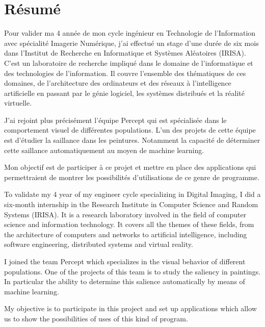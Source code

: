 \chapter*{Résumé}
\par
    Pour valider ma 4 année de mon cycle ingénieur en Technologie de 
    l'Information avec spécialité Imagerie Numérique, j'ai effectué un stage 
    d'une durée de six mois dans l'Institut de Recherche en Informatique et 
    Systèmes Aléatoires (IRISA). C'est un laboratoire de recherche impliqué dans 
    le domaine de l'informatique et des technologies de l'information. Il couvre 
    l'ensemble des thématiques de ces domaines, de l’architecture des 
    ordinateurs et des réseaux à l’intelligence artificielle en passant par le 
    génie logiciel, les systèmes distribués et la réalité virtuelle.

\par
    J'ai rejoint plus précisément l'équipe Percept qui est spécialisée 
    dans le comportement visuel de différentes populations. L'un des projets de 
    cette équipe est d'étudier la saillance dans les peintures. Notamment la capacité 
    de déterminer cette saillance automatiquement au moyen de machine learning.

\par
    Mon objectif est de participer à ce projet et mettre en place des 
    applications qui permettraient de montrer les possibilités d'utilisations de 
    ce genre de programme.

\vspace{40pt}

\color{gray}
\par
    To validate my 4 year of my engineer cycle specializing in Digital 
    Imaging, I did a six-month internship in the Research Institute in Computer 
    Science and Random Systems (IRISA). It is a research laboratory involved in 
    the field of computer science and information technology. It covers all the 
    themes of these fields, from the architecture of computers and networks to 
    artificial intelligence, including software engineering, distributed systems 
    and virtual reality. 

\par
    I joined the team Percept which specializes in the visual behavior of 
    different populations. One of the projects of this team is to study the 
    saliency in paintings. In particular the ability to determine this salience 
    automatically by means of machine learning. 

\par
    My objective is to participate in this project and set up applications which 
    allow us to show the possibilities of uses of this kind of program.

\color{black}